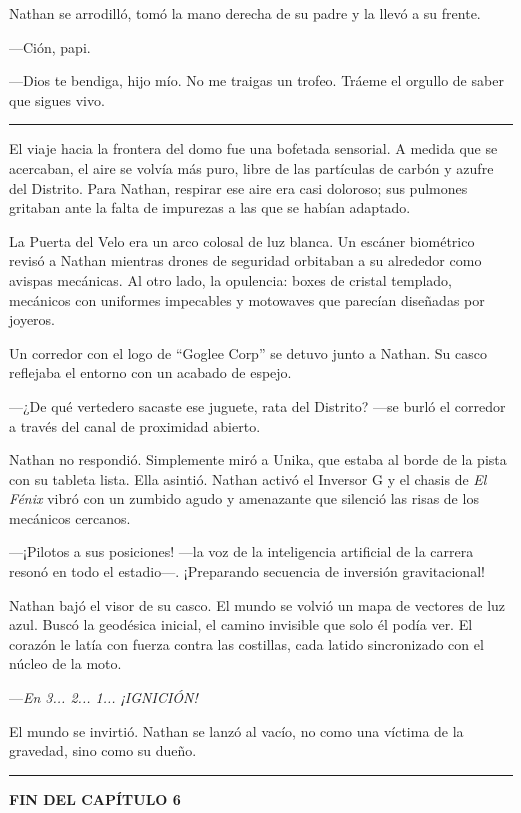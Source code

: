 \documentclass[12pt,a4paper]{book}
\begin{document}
Nathan se arrodilló, tomó la mano derecha de su padre y la llevó a su frente.

---Ción, papi.

---Dios te bendiga, hijo mío. No me traigas un trofeo. Tráeme el orgullo de saber que sigues vivo.

\bigskip
\noindent\rule{\textwidth}{0.4pt}
\bigskip

El viaje hacia la frontera del domo fue una bofetada sensorial. A medida que se acercaban, el aire se volvía más puro, libre de las partículas de carbón y azufre del Distrito. Para Nathan, respirar ese aire era casi doloroso; sus pulmones gritaban ante la falta de impurezas a las que se habían adaptado.

La Puerta del Velo era un arco colosal de luz blanca. Un escáner biométrico revisó a Nathan mientras drones de seguridad orbitaban a su alrededor como avispas mecánicas. Al otro lado, la opulencia: boxes de cristal templado, mecánicos con uniformes impecables y motowaves que parecían diseñadas por joyeros.

Un corredor con el logo de ``Goglee Corp'' se detuvo junto a Nathan. Su casco reflejaba el entorno con un acabado de espejo.

---¿De qué vertedero sacaste ese juguete, rata del Distrito? ---se burló el corredor a través del canal de proximidad abierto.

Nathan no respondió. Simplemente miró a Unika, que estaba al borde de la pista con su tableta lista. Ella asintió. Nathan activó el Inversor G y el chasis de \textit{El Fénix} vibró con un zumbido agudo y amenazante que silenció las risas de los mecánicos cercanos.

---¡Pilotos a sus posiciones! ---la voz de la inteligencia artificial de la carrera resonó en todo el estadio---. ¡Preparando secuencia de inversión gravitacional!

Nathan bajó el visor de su casco. El mundo se volvió un mapa de vectores de luz azul. Buscó la geodésica inicial, el camino invisible que solo él podía ver. El corazón le latía con fuerza contra las costillas, cada latido sincronizado con el núcleo de la moto.

---\textit{En 3... 2... 1... ¡IGNICIÓN!}

El mundo se invirtió. Nathan se lanzó al vacío, no como una víctima de la gravedad, sino como su dueño.

\bigskip
\noindent\rule{\textwidth}{0.4pt}
\bigskip

\textbf{FIN DEL CAPÍTULO 6}
\end{document}
